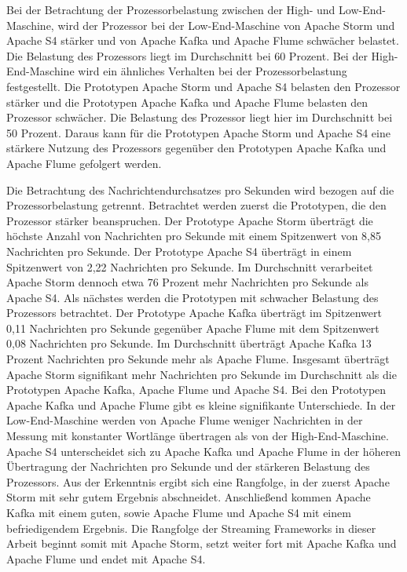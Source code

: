 Bei der Betrachtung der Prozessorbelastung zwischen der High- und Low-End-Maschine, wird der Prozessor bei der Low-End-Maschine von Apache Storm und Apache S4 stärker und von Apache Kafka und Apache Flume schwächer belastet. Die Belastung des Prozessors liegt im Durchschnitt bei 60 Prozent. Bei der High-End-Maschine wird ein ähnliches Verhalten bei der Prozessorbelastung festgestellt. Die Prototypen Apache Storm und Apache S4 belasten den Prozessor stärker und die Prototypen Apache Kafka und Apache Flume belasten den Prozessor schwächer. Die Belastung des Prozessor liegt hier im Durchschnitt bei 50 Prozent. Daraus kann für die Prototypen Apache Storm und Apache S4 eine stärkere Nutzung des Prozessors gegenüber den Prototypen Apache Kafka und Apache Flume gefolgert werden.

Die Betrachtung des Nachrichtendurchsatzes pro Sekunden wird bezogen auf die Prozessorbelastung getrennt. Betrachtet werden zuerst die Prototypen, die den Prozessor stärker beanspruchen. Der Prototype Apache Storm überträgt die höchste Anzahl von Nachrichten pro Sekunde mit einem Spitzenwert von 8,85 Nachrichten pro Sekunde. Der Prototype Apache S4 überträgt in einem Spitzenwert von 2,22 Nachrichten pro Sekunde. Im Durchschnitt verarbeitet Apache Storm dennoch etwa 76 Prozent mehr Nachrichten pro Sekunde als Apache S4. Als nächstes werden die Prototypen mit schwacher Belastung des Prozessors betrachtet. Der Prototype Apache Kafka überträgt im Spitzenwert 0,11 Nachrichten pro Sekunde gegenüber Apache Flume mit dem Spitzenwert 0,08 Nachrichten pro Sekunde. Im Durchschnitt überträgt Apache Kafka 13 Prozent Nachrichten pro Sekunde mehr als Apache Flume. Insgesamt überträgt Apache Storm signifikant mehr Nachrichten pro Sekunde im Durchschnitt als die Prototypen Apache Kafka, Apache Flume und Apache S4. Bei den Prototypen Apache Kafka und Apache Flume gibt es kleine signifikante Unterschiede. In der Low-End-Maschine werden von Apache Flume weniger Nachrichten in der Messung mit konstanter Wortlänge übertragen als von der High-End-Maschine. Apache S4 unterscheidet sich zu Apache Kafka und Apache Flume in der höheren Übertragung der Nachrichten pro Sekunde und der stärkeren Belastung des Prozessors. Aus der Erkenntnis ergibt sich eine Rangfolge, in der zuerst Apache Storm mit sehr gutem Ergebnis abschneidet. Anschließend kommen Apache Kafka mit einem guten, sowie Apache Flume und Apache S4 mit einem befriedigendem Ergebnis. Die Rangfolge der Streaming Frameworks in dieser Arbeit beginnt somit mit Apache Storm, setzt weiter fort mit Apache Kafka und Apache Flume und endet mit Apache S4.

